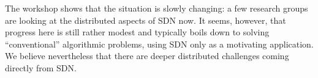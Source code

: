 \documentclass[11pt,pdftex,letter]{article}
\begin{document}
The workshop shows that the situation is slowly changing: a few
research groups are looking at the distributed aspects of SDN now.    
It seems, however, that progress here is still rather modest and
typically boils down to solving ``conventional'' algorithmic problems, 
using SDN only as a motivating application. We believe nevertheless that
there are deeper distributed challenges coming directly from SDN.  



\end{document}
